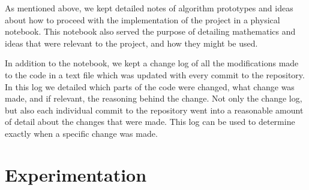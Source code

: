 \documentclass[a4paper,11pt,twoside]{article}
\begin{document}
   As mentioned above, we kept detailed notes of algorithm prototypes and ideas
   about how to proceed with the implementation of the project in a physical
   notebook. This notebook also served the purpose of detailing mathematics and
   ideas that were relevant to the project, and how they might be used. 

   In addition to the notebook, we kept a change log of all the modifications
   made to the code in a text file which was updated with every commit to the
   repository. In this log we detailed which parts of the code were changed,
   what change was made, and if relevant, the reasoning behind the change. Not
   only the change log, but also each individual commit to the repository went
   into a reasonable amount of detail about the changes that were made. This log
   can be used to determine exactly when a specific change was made.
\section{Experimentation}
\label{sec-8}
\end{document}
